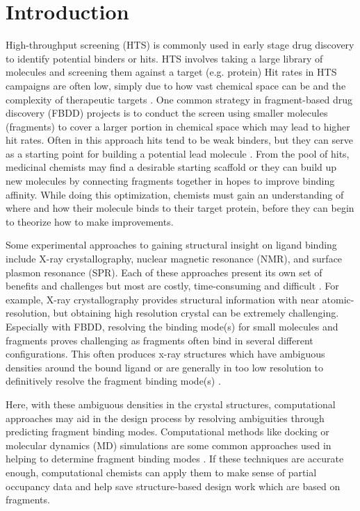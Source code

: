 \section{Introduction}
High-throughput screening (HTS) is commonly used in early stage drug discovery to identify potential binders or hits.
HTS involves taking a large library of molecules and screening them against a target (e.g. protein)
Hit rates in HTS campaigns are often low, simply due to how vast chemical space can be and the complexity of therapeutic targets \cite{erlanson_introduction_2012}.
One common strategy in fragment-based drug discovery (FBDD) projects is to conduct the screen using smaller molecules (fragments) to cover a larger portion in chemical space which may lead to higher hit rates.
Often in this approach hits tend to be weak binders, but they can serve as a starting point for building a potential lead molecule \cite{erlanson_tethering:_2004}.
From the pool of hits, medicinal chemists may find a desirable starting scaffold or they can build up new molecules by connecting fragments together in hopes to improve binding affinity.
While doing this optimization, chemists must gain an understanding of where and how their molecule binds to their target protein, before they can begin to theorize how to make improvements.

Some experimental approaches to gaining structural insight on ligand binding include X-ray crystallography, nuclear magnetic resonance (NMR), and surface plasmon resonance (SPR).
Each of these approaches present its own set of benefits and challenges but most are costly, time-consuming and difficult \cite{jhoti_fragment-based_2007, gozalbes_contributions_2010}.
For example, X-ray crystallography provides structural information with near atomic-resolution, but obtaining high resolution crystal can be extremely challenging.
Especially with FBDD, resolving the binding mode(s) for small molecules and fragments proves challenging as fragments often bind in several different configurations.
This often produces x-ray structures which have ambiguous densities around the bound ligand or are generally in too low resolution to definitively resolve the fragment binding mode(s) \cite{domagalski_quality_2014}.

Here, with these ambiguous densities in the crystal structures, computational approaches may aid in the design process by resolving ambiguities through predicting fragment binding modes.
Computational methods like docking or molecular dynamics (MD) simulations are some common approaches used in helping to determine fragment binding modes \cite{durrant_computer-aided_2010, sliwoski_computational_2014}.
If these techniques are accurate enough, computational chemists can apply them to make sense of partial occupancy data and help save structure-based design work which are based on fragments.

